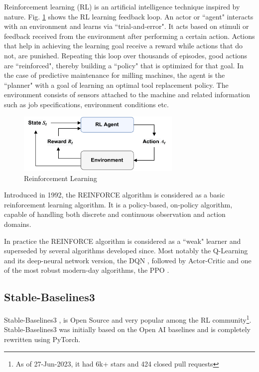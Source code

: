 \documentclass[a4paper, 12pt]{article}
\begin{document}
Reinforcement learning (RL) is an artificial intelligence technique inspired by nature. Fig. \ref{fig:RL-loop} \citep{barto2018} shows the RL learning feedback loop. An actor or ``agent" interacts with an environment and learns via ``trial-and-error". It acts based on stimuli or feedback received from the environment after performing a certain action. Actions that help in achieving the learning goal receive a reward while actions that do not, are punished. Repeating this loop over thousands of episodes, good actions are ``reinforced", thereby building a ``policy" that is optimized for that goal. In the case of predictive maintenance for milling machines, the agent is the ``planner" with a goal of learning an optimal tool replacement policy. The environment consists of sensors attached to the machine and related information such as job specifications, environment conditions etc.

\begin{figure}[!h]
	\centering
	\includegraphics[width=0.7\textwidth]{RL-loop.pdf}
	\caption{Reinforcement Learning}
	\label{fig:RL-loop}
\end{figure}

Introduced in 1992, the REINFORCE algorithm \citep{REINFORCE-williams1992} is considered as a basic reinforcement learning algorithm. It is a policy-based, on-policy algorithm, capable of handling both discrete and continuous observation and action domains.

In practice the REINFORCE algorithm is considered as a ``weak" learner and superseded by several algorithms developed since. Most notably the Q-Learning and its deep-neural network version, the DQN \citep{DQN-mnih2013}, followed by Actor-Critic \citep{A2C-mnih2016} and one of the most robust modern-day algorithms, the PPO \citep{PPO-schulman2017}.

\subsection{Stable-Baselines3}
Stable-Baselines3 \cite{SB3-paper}, is Open Source and very popular among the RL community\footnote{As of 27-Jun-2023, it had 6k+ stars and 424 closed pull requests}. Stable-Baselines3 was initially based on the Open AI baselines \citep{OpenAI-baselines} and is completely rewritten using PyTorch. 
\end{document}
